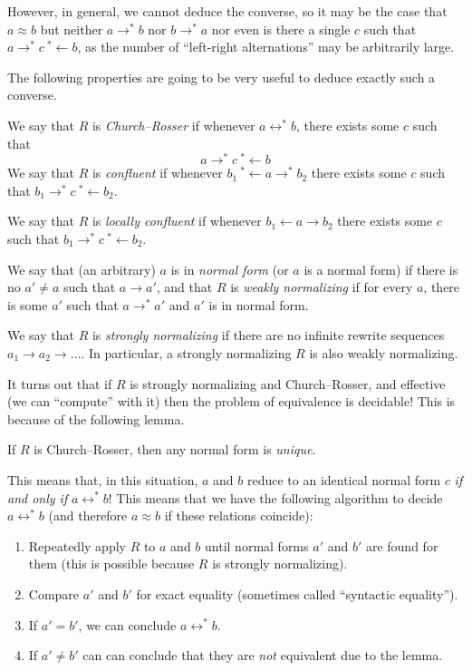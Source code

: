 However, in general, we cannot deduce the converse, so it may be the case that $a\approx b$ but neither $a\rightarrow^*b$ nor $b\rightarrow^*a$ nor even is there a single $c$ such that $a\rightarrow^* c\ {}^*\leftarrow b$, as the number of ``left-right alternations'' may be arbitrarily large.

The following properties are going to be very useful to deduce exactly such a converse.

\begin{definition}
  We say that $R$ is \emph{Church--Rosser} if whenever $a\leftrightarrow^* b$, there exists some $c$ such that
  \[a\rightarrow^* c\ {}^*\leftarrow b\]
  We say that $R$ is \emph{confluent} if whenever $b_1\ {}^*\leftarrow a\rightarrow^* b_2$ there exists some $c$ such that $b_1\rightarrow^* c\ {}^*\leftarrow b_2$.

  We say that $R$ is \emph{locally confluent} if whenever $b_1\leftarrow a\rightarrow b_2$ there exists some $c$ such that $b_1\rightarrow^* c\ {}^*\leftarrow b_2$.

  We say that (an arbitrary) $a$ is in \emph{normal form} (or $a$ is a normal form) if there is no $a' \neq a$ such that $a \rightarrow a'$, and that $R$ is \emph{weakly normalizing} if for every $a$, there is some $a'$ such that $a\rightarrow^*a'$ and $a'$ is in normal form.

  We say that $R$ is \emph{strongly normalizing} if there are no infinite rewrite sequences $a_1\rightarrow a_2\rightarrow \ldots$. In particular, a strongly normalizing $R$ is also weakly normalizing.
\end{definition}

It turns out that if $R$ is strongly normalizing and Church--Rosser, and effective (we can ``compute'' with it) then the problem of equivalence is decidable! This is because of the following lemma.

\begin{lemma}
  If $R$ is Church--Rosser, then any normal form is \emph{unique}.
\end{lemma}

This means that, in this situation, $a$ and $b$ reduce to an identical normal form $c$ \emph{if and only if} $a\leftrightarrow^* b$! This means that we have the following algorithm to decide $a\leftrightarrow^* b$ (and therefore $a\approx b$ if these relations coincide):
\begin{enumerate}
  \item Repeatedly apply $R$ to $a$ and $b$ until normal forms $a'$ and $b'$ are found for them (this is possible because $R$ is strongly normalizing).
  \item Compare $a'$ and $b'$ for exact equality (sometimes called ``syntactic equality'').
  \item If $a' = b'$, we can conclude $a\leftrightarrow^* b$.
  \item If $a' \neq b'$ can can conclude that they are \emph{not} equivalent due to the lemma.
\end{enumerate}

